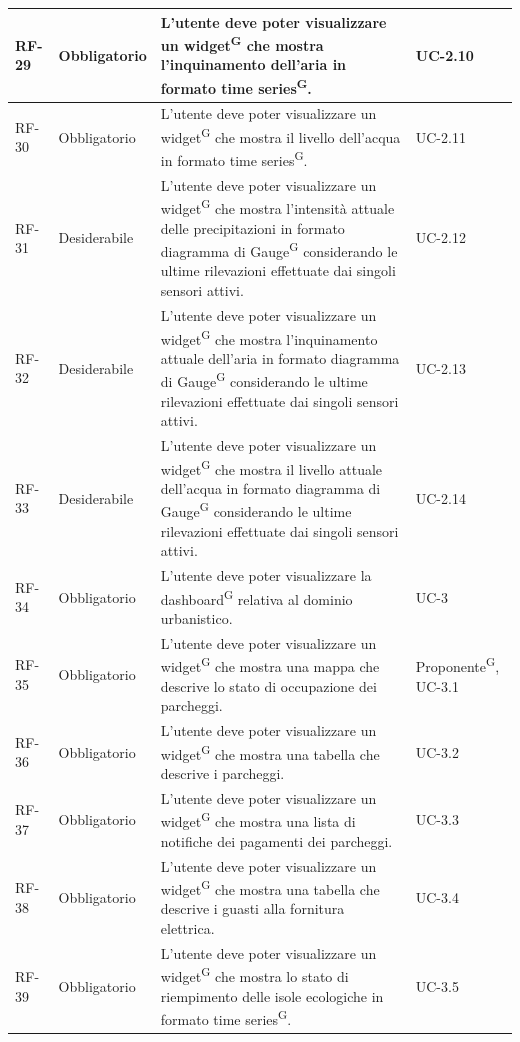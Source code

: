 \documentclass[8pt]{article}
\newcommand{\glossterm}[1]{#1\textsuperscript{G}} %
\begin{document}
\begin{longtable}{|>{\centering\arraybackslash}p{1.2cm}|>{\centering\arraybackslash}p{2cm}|>{\centering\arraybackslash}p{8.5cm}|>{\centering\arraybackslash}p{3cm}|}
            RF-29 & Obbligatorio & L'utente deve poter visualizzare un \glossterm{widget} che mostra l'inquinamento dell'aria in formato \glossterm{time series}. & UC-2.10 \\ \hline
            RF-30 & Obbligatorio & L'utente deve poter visualizzare un \glossterm{widget} che mostra il livello dell'acqua in formato \glossterm{time series}. & UC-2.11 \\ \hline
            RF-31 & Desiderabile & L'utente deve poter visualizzare un \glossterm{widget} che mostra l'intensità attuale delle precipitazioni in formato diagramma di \glossterm{Gauge} considerando le ultime rilevazioni effettuate dai singoli sensori attivi. & UC-2.12 \\ \hline
            RF-32 & Desiderabile & L'utente deve poter visualizzare un \glossterm{widget} che mostra l'inquinamento attuale dell'aria in formato diagramma di \glossterm{Gauge} considerando le ultime rilevazioni effettuate dai singoli sensori attivi. & UC-2.13 \\ \hline
            RF-33 & Desiderabile & L'utente deve poter visualizzare un \glossterm{widget} che mostra il livello attuale dell'acqua in formato diagramma di \glossterm{Gauge} considerando le ultime rilevazioni effettuate dai singoli sensori attivi. & UC-2.14 \\ \hline
            RF-34 & Obbligatorio & L'utente deve poter visualizzare la \glossterm{dashboard} relativa al dominio urbanistico. & UC-3 \\ \hline
            RF-35 & Obbligatorio & L'utente deve poter visualizzare un \glossterm{widget} che mostra una mappa che descrive lo stato di occupazione dei parcheggi. & \glossterm{Proponente}, UC-3.1 \\ \hline
            RF-36 & Obbligatorio & L'utente deve poter visualizzare un \glossterm{widget} che mostra una tabella che descrive i parcheggi. & UC-3.2 \\ \hline
            RF-37 & Obbligatorio & L'utente deve poter visualizzare un \glossterm{widget} che mostra una lista di notifiche dei pagamenti dei parcheggi. & UC-3.3 \\ \hline
            RF-38 & Obbligatorio & L'utente deve poter visualizzare un \glossterm{widget} che mostra una tabella che descrive i guasti alla fornitura elettrica. & UC-3.4 \\ \hline
            RF-39 & Obbligatorio & L'utente deve poter visualizzare un \glossterm{widget} che mostra lo stato di riempimento delle isole ecologiche in formato \glossterm{time series}. & UC-3.5 \\ \hline

\end{longtable}
\end{document}
